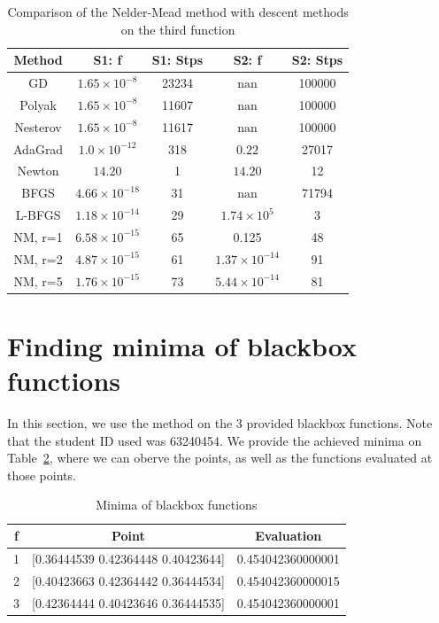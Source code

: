 \documentclass[9pt]{IEEEtran}
\begin{document}
\begin{table}[h]
    \centering
    \begin{tabular}{|c|c|c|c|c|}
        \hline
        \textbf{Method} & \textbf{S1: f} & \textbf{S1: Stps} & \textbf{S2: f} & \textbf{S2: Stps} \\ \hline
        GD       & $1.65\times10^{-8}$  & 23234  & $\text{nan}$          & 100000 \\ \hline
        Polyak   & $1.65\times10^{-8}$  & 11607  & $\text{nan}$          & 100000 \\ \hline
        Nesterov & $1.65\times10^{-8}$  & 11617  & $\text{nan}$          & 100000 \\ \hline
        AdaGrad  & $1.0\times10^{-12}$ & 318    & $0.22$            & 27017  \\ \hline
        Newton   & $14.20$             & 1      & $14.20$           & 12     \\ \hline
        BFGS     & $4.66\times10^{-18}$ & 31     & $\text{nan}$          & 71794  \\ \hline
        L-BFGS   & $1.18\times10^{-14}$ & 29     & $1.74\times10^{5}$ & 3      \\ \hline
        NM, r=1 & $6.58 \times 10^{-15}$  & 65 & 0.125 & 48 \\ \hline
        NM, r=2 & $4.87 \times 10^{-15}$  & 61 & $1.37 \times 10^{-14}$ & 91 \\ \hline
        NM, r=5 & $1.76 \times 10^{-15}$  & 73 & $5.44 \times 10^{-14}$ & 81 \\ \hline
    \end{tabular}
        \caption{Comparison of the Nelder-Mead method with descent methods on the third
    function}
    \label{tab:f3}
\end{table}

\section{Finding minima of blackbox functions}
In this section, we use the method on the 3 provided blackbox functions. Note 
that the student ID used was 63240454. We provide the achieved minima on 
Table~\ref{tab:bb}, where we can oberve the points, as well as the functions 
evaluated at those points.

\begin{table}[h]
    \centering
    \begin{tabular}{|c|c|c|}
        \hline
      f & Point & Evaluation \\\hline
    1 & [0.36444539 0.42364448 0.40423644] & 0.454042360000001 \\\hline
    2 & [0.40423663 0.42364442 0.36444534] & 0.454042360000015 \\\hline
    3 & [0.42364444 0.40423646 0.36444535] & 0.454042360000001 \\\hline

    \end{tabular}
    \label{tab:bb}
    \vspace{3pt}
    \caption{Minima of blackbox functions}
\end{table}
\end{document}
